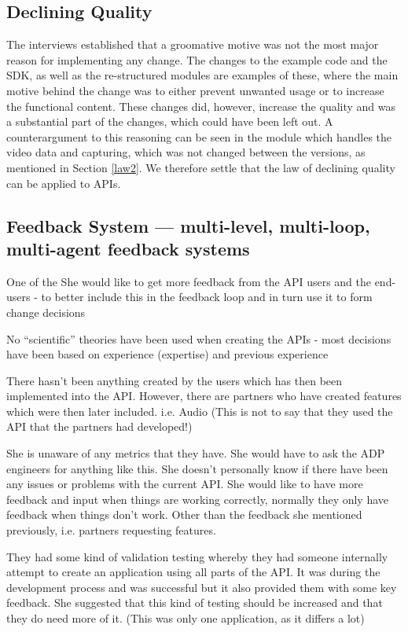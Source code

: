 \documentclass{sig-alternate}
\begin{document}
\subsection{Declining Quality}
The interviews established that a groomative motive was not the most major reason for implementing any change. The changes to the example code and the SDK, as well as the re-structured modules are examples of these, where the main motive behind the change was to either prevent unwanted usage or to increase the functional content. These changes did, however, increase the quality and was a substantial part of the changes, which could have been left out. A counterargument to this reasoning can be seen in the module which handles the video data and capturing, which was not changed between the versions, as mentioned in Section \ref{law2}. We therefore settle that the law of declining quality can be applied to APIs. 

\subsection{Feedback System — multi-level, multi-loop, multi-agent feedback systems}
One of the 
She would like to get more feedback from the API users and the end-users - to better include this in the feedback loop and in turn use it to form change decisions

No “scientific” theories have been used when creating the APIs - most decisions have been based on experience (expertise) and previous experience

There hasn’t been anything created by the users which has then been implemented into the API. However, there are partners who have created features which were then later included. i.e. Audio (This is not to say that they used the API that the partners had developed!)



She is unaware of any metrics that they have. She would have to ask the ADP engineers for anything like this. She doesn’t personally know if there have been any issues or problems with the current API. She would like to have more feedback and input when things are working correctly, normally they only have feedback when things don’t work. Other than the feedback she mentioned previously, i.e. partners requesting features.



They had some kind of validation testing whereby they had someone internally attempt to create an application using all parts of the API. It was during the development process and was successful but it also provided them with some key feedback. She suggested that this kind of testing should be increased and that they do need more of it. (This was only one application, as it differs a lot)
\end{document}
